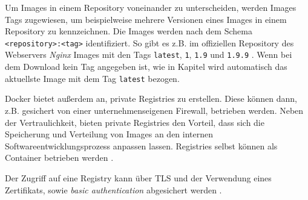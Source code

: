 \documentclass[../main.tex]{subfiles}
\begin{document}
			Um Images in einem Repository voneinander zu unterscheiden, werden Images Tags zugewiesen, um beispielweise mehrere Versionen eines Images in einem Repository zu kennzeichnen. Die Images werden nach dem Schema \texttt{<repository>:<tag>} identifiziert. So gibt es z.B. im offiziellen Repository des Webservers \emph{Nginx} Images mit den Tags \texttt{latest}, \texttt{1}, \texttt{1.9} und \texttt{1.9.9} \cite{dockerHubNginx}. Wenn bei dem Download kein Tag angegeben ist, wie in Kapitel wird automatisch das aktuellste Image mit dem Tag \texttt{latest} bezogen.





      Docker bietet außerdem an, private Registries zu erstellen. Diese können dann, z.B. gesichert von einer unternehmenseigenen Firewall, betrieben werden. Neben der Vertraulichkeit, bieten private Registries den Vorteil, dass sich die Speicherung und Verteilung von Images an den internen Softwareentwicklungsprozess anpassen lassen. Registries selbst können als Container betrieben werden \cite{dockerRegistry}.

      Der Zugriff auf eine Registry kann über \acrshort{TLS} und der Verwendung eines Zertifikats, sowie \emph{basic authentication} abgesichert werden \cite{dockerRegistry}.
\end{document}
